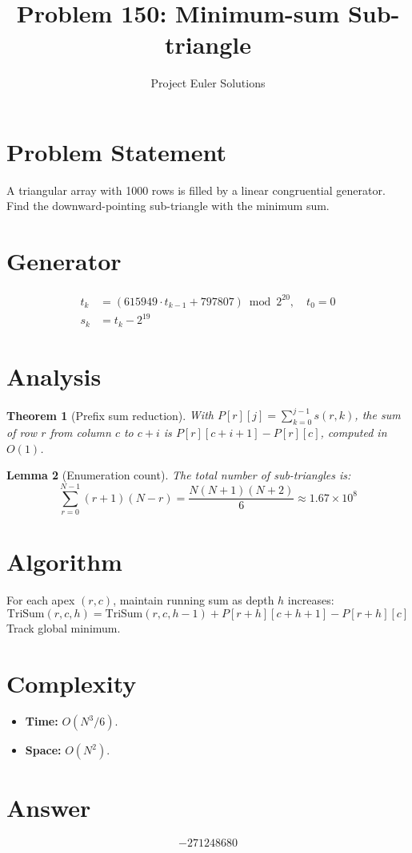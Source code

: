 \documentclass[11pt]{article}
\title{Problem 150: Minimum-sum Sub-triangle}
\author{Project Euler Solutions}
\date{}
\newtheorem{theorem}{Theorem}
\newtheorem{lemma}[theorem]{Lemma}
\begin{document}
\maketitle

\section{Problem Statement}
A triangular array with 1000 rows is filled by a linear congruential generator. Find the downward-pointing sub-triangle with the minimum sum.

\section{Generator}
\begin{align}
t_k &= (615949 \cdot t_{k-1} + 797807) \bmod 2^{20}, \quad t_0 = 0 \\
s_k &= t_k - 2^{19}
\end{align}

\section{Analysis}

\begin{theorem}[Prefix sum reduction]
With $P[r][j] = \sum_{k=0}^{j-1} s(r,k)$, the sum of row $r$ from column $c$ to $c+i$ is $P[r][c+i+1] - P[r][c]$, computed in $O(1)$.
\end{theorem}

\begin{lemma}[Enumeration count]
The total number of sub-triangles is:
\[
\sum_{r=0}^{N-1} (r+1)(N-r) = \frac{N(N+1)(N+2)}{6} \approx 1.67 \times 10^8
\]
\end{lemma}

\section{Algorithm}
For each apex $(r,c)$, maintain running sum as depth $h$ increases:
\[
\text{TriSum}(r,c,h) = \text{TriSum}(r,c,h-1) + P[r+h][c+h+1] - P[r+h][c]
\]
Track global minimum.

\section{Complexity}
\begin{itemize}
\item \textbf{Time:} $O(N^3/6)$.
\item \textbf{Space:} $O(N^2)$.
\end{itemize}

\section{Answer}

\[
\boxed{-271248680}
\]
\end{document}
